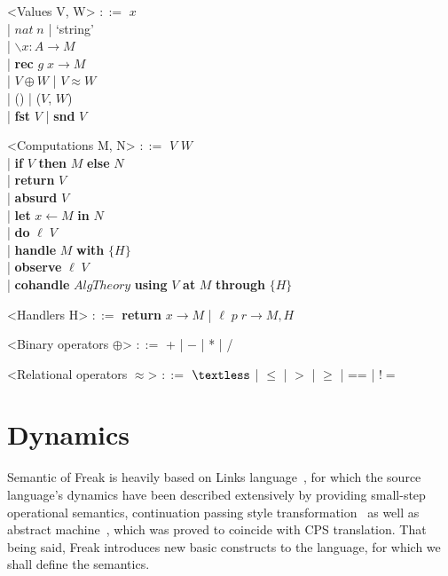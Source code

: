 \documentclass[declaration,shortabstract]{iithesis}
\theoremstyle{definition} \newtheorem{definition}{Definition}[chapter]
\theoremstyle{remark} \newtheorem{remark}[definition]{Observation}
\theoremstyle{plain} \newtheorem{theorem}[definition]{Theorem}
\theoremstyle{plain} \newtheorem{lemma}[definition]{Lemma}
\begin{document}
    \begin{grammar}

        <Values V, W> $::=$ $ x $ \\
            | $nat \; n$ | `string'  \\
            | $ \backslash x : A \rightarrow M $ \\
            | \textbf{rec} $ g \; x \rightarrow M $\\
            | $V \oplus W$ | $V \approx W$ \\
            | () | ($V$, $W$) \\
            | \textbf{fst} $V$ | \textbf{snd} $V$

        <Computations M, N> $::=$ $ V $ $ W $ \\
            | \textbf{if} $V$ \textbf{then} $M$ \textbf{else} $N$ \\
            | \textbf{return} $V$ \\
            | \textbf{absurd} $ V $ \\
            | \textbf{let} $ x \leftarrow M $ \textbf{in} $ N $ \\
            | \textbf{do} $\ell \; V$ \\
            | \textbf{handle} $M$ \textbf{with} $ \{ H \} $ \\
            | \textbf{observe} $\ell \; V$ \\
            | \textbf{cohandle} $AlgTheory$ \textbf{using} $V$ \textbf{at} $M$ \textbf{through} $ \{ H \} $

        <Handlers H> $::=$ \textbf{return} $ x \rightarrow M $ | $ \ell \; p \; r \rightarrow M, H $

        <Binary operators $\oplus$> $::=$ + | $-$ | * | /

        <Relational operators $\approx$> $::=$ $ \textless $ | $\leqslant$ | $>$ | $\geqslant$ | == | $!= $

    \end{grammar}

\section{Dynamics}

    Semantic of Freak is heavily based on Links language~\cite{handlers-cps-journal},
    for which the source language's dynamics have been described extensively by
    providing small-step operational semantics, continuation passing style
    transformation~\cite{handlers-cps} as well as abstract
    machine~\cite{liberating-effects}, which was proved to coincide with CPS
    translation. That being said, Freak introduces new basic constructs to the
    language, for which we shall define the semantics.
\end{document}
